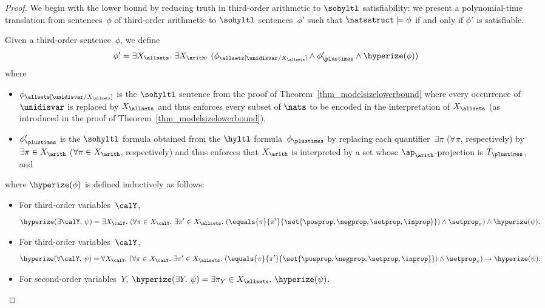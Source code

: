 \begin{proof}
We begin with the lower bound by reducing truth in third-order arithmetic to $\sohyltl$ satisfiability: we present a polynomial-time translation from sentences~$\phi$ of third-order arithmetic to $\sohyltl$ sentences~$\phi'$ such that $\natsstruct \models \phi$ if and only if $\phi'$ is satisfiable.

Given a third-order sentence~$\phi$, we define \[\phi' = \exists X_\allsets.\ \exists X_\arith.\ (\phi_\allsets[\unidisvar/X_\allsets] \wedge \phi'_\plustimes \wedge \hyperize(\phi))\] where 
\begin{itemize}
    \item $\phi_\allsets[\unidisvar/X_\allsets]$ is the $\sohyltl$ sentence from the proof of Theorem~\ref{thm_modelsizelowerbound} where every occurrence of $\unidisvar$ is replaced by $X_\allsets$ and thus enforces every subset of $\nats$ to be encoded in the interpretation of $X_\allsets$ (as introduced in the proof of Theorem~\ref{thm_modelsizelowerbound}),
    \item $\phi'_\plustimes$ is the $\sohyltl$ formula obtained from the $\hyltl$ formula~$\phi_\plustimes$ by replacing each quantifier~$\exists \pi$ ($\forall \pi$, respectively) by $\exists \pi \in X_\arith$ ($\forall \pi \in X_\arith$, respectively) and thus enforces that $X_\arith$ is interpreted by a set whose $\ap_\arith$-projection is $T_\plustimes$, and
\end{itemize}
  where $\hyperize(\phi)$ is defined inductively as follows:
  
\begin{itemize}
    
    \item For third-order variables~$\calY$, \[\hyperize(\exists \calY.\ \psi) = \exists X_\calY.\ (\forall \pi \in X_\calY.\ \exists \pi' \in X_\allsets.\ (\equals{\pi}{\pi'}{\set{\posprop, \negprop,\setprop,\inprop}}) \wedge \setprop_{\pi}) \wedge \hyperize(\psi).\]
    
    \item For third-order variables~$\calY$, \[\hyperize(\forall \calY.\ \psi) = \forall X_\calY.\ (\forall \pi \in X_\calY.\  \exists \pi' \in X_\allsets.\ (\equals{\pi}{\pi'}{\set{\posprop, \negprop,\setprop,\inprop}}) \wedge \setprop_{\pi}) \rightarrow \hyperize(\psi).\]
    
    \item For second-order variables~$Y$, $\hyperize(\exists Y.\ \psi) = \exists \pi_Y \in X_\allsets.\  \hyperize(\psi)$.
    

\end{itemize}
\end{proof}
